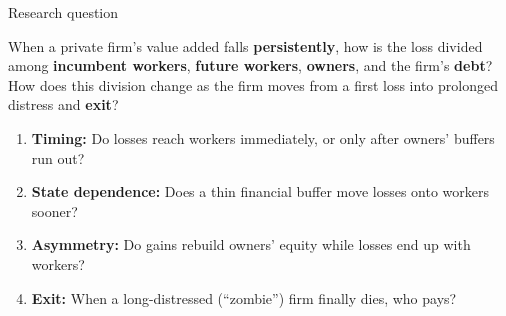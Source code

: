 \documentclass[aspectratio=169,11pt]{beamer}
\newcommand{\hl}[1]{{\color{WarmAmber}\bfseries #1}}
\begin{document}
\begin{frame}{Research question}
  \vspace{4pt}
  \begin{keybox}
    \large When a private firm's value added falls \hl{persistently}, how is the loss divided among
    \textbf{incumbent workers}, \textbf{future workers}, \textbf{owners}, and the firm's \textbf{debt}?
    How does this division change as the firm moves from a first loss into \alert{prolonged distress} and \textbf{exit}?
  \end{keybox}
  \vspace{8pt}
  \begin{enumerate}
    \item \textbf{Timing:} Do losses reach workers immediately, or only after owners' buffers run out?
    \item \textbf{State dependence:} Does a thin financial buffer move losses onto workers sooner?
    \item \textbf{Asymmetry:} Do gains rebuild owners' equity while losses end up with workers?
    \item \textbf{Exit:} When a long-distressed (``zombie'') firm finally dies, who pays?
  \end{enumerate}
\end{frame}
\end{document}
